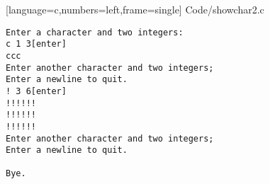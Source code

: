 \begin{frame}

[language=c,numbers=left,frame=single]
{Code/showchar2.c}
\end{frame}
\begin{frame}[fragile]
\begin{lstlisting}[backgroundcolor=\color{blue!20}]
Enter a character and two integers:
c 1 3[enter]
ccc
Enter another character and two integers;
Enter a newline to quit.
! 3 6[enter]
!!!!!!
!!!!!!
!!!!!!
Enter another character and two integers;
Enter a newline to quit.

Bye.
\end{lstlisting}
\end{frame}
